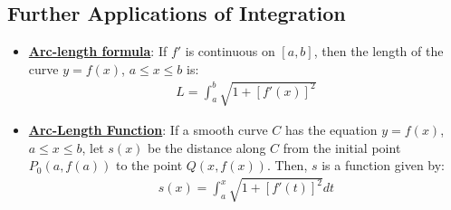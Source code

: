 \documentclass[reqno,11pt]{amsart}
\theoremstyle{definition}
\theoremstyle{remark}
\newcommand{\dfn}[1]{\underline{\textbf{#1}}}
\begin{document}
\subsection{Further Applications of Integration}
\begin{itemize}[noitemsep]
	\item \dfn{Arc-length formula}: If $f'$ is continuous on $[a,b]$, then the length of the curve $y=f(x)$, $a \leq x \leq b$ is: 
	\begin{align}
		L = \int_a^b \sqrt{1+ [ f'(x)]^2}	
	\end{align}
	\item \dfn{Arc-Length Function}: If a smooth curve $C$ has the equation $y=f(x)$, $ a \leq x \leq b$, let $s(x)$ be the distance along $C$ from the initial point $P_0(a, f(a))$ to the point $Q(x, f(x))$. Then, $s$ is a function given by: 
	\begin{align}
		s(x) = \int_a^x \sqrt{1+ [f'(t)]^2} dt 	
	\end{align}
\end{itemize}
\end{document}
